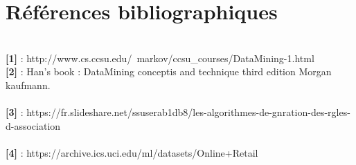 \documentclass[12pt,a4paper,oneside]{book}
\begin{document}
\newpage
\chapter*{Références bibliographiques}
\textbf{ }\\

\textbf{[1]} : 
http://www.cs.ccsu.edu/~markov/ccsu\_courses/DataMining-1.html
\textbf{ }\\

\textbf{[2]} : Han's book : DataMining conceptis and technique third edition Morgan kaufmann.\\
\textbf{ }\\

\textbf{[3]} : https://fr.slideshare.net/ssuserab1db8/les-algorithmes-de-gnration-des-rgles-d-association\\
\textbf{ }\\

\textbf{[4]} : https://archive.ics.uci.edu/ml/datasets/Online+Retail
\end{document}
